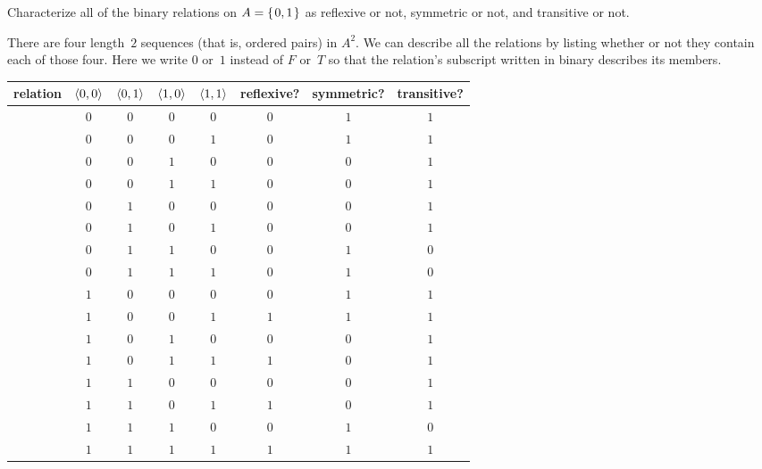 \documentclass{ibl}  %
\begin{document}
\begin{problem}[\maxlength]
  Characterize all of the binary relations on $A=\mbox{$\{\hspace{0.1em}0,1\hspace{0.1em}\}$}$
  as reflexive or not, symmetric or not,
  and transitive or not.
\begin{answer}
There are four length~$2$ sequences (that is, ordered pairs) in $A^2$.
We can describe all the relations by listing whether or not they
contain each of those four.
Here we write $0$ or~$1$ instead of $F$ or~$T$ so that the relation's
subscript written in binary describes its members.
\begin{center}
  \def\adjrel#1{\makebox[1.5em][l]{#1}} %
  \begin{tabular}{c|cccc|ccc}
    relation
    &$\langle0,0\rangle$ &$\langle0,1\rangle$ &$\langle1,0\rangle$ &$\langle1,1\rangle$
      &reflexive?  &symmetric?  &transitive?  \\ \hline
    \adjrel{$R_0$} &$0$ &$0$ &$0$ &$0$ &$0$  &$1$  &$1$  \\ 
    \adjrel{$R_1$} &$0$ &$0$ &$0$ &$1$ &$0$  &$1$  &$1$  \\ 
    \adjrel{$R_2$} &$0$ &$0$ &$1$ &$0$ &$0$  &$0$  &$1$  \\ 
    \adjrel{$R_3$} &$0$ &$0$ &$1$ &$1$ &$0$  &$0$  &$1$  \\[0.5ex] %
    \adjrel{$R_4$} &$0$ &$1$ &$0$ &$0$ &$0$  &$0$  &$1$  \\ 
    \adjrel{$R_5$} &$0$ &$1$ &$0$ &$1$ &$0$  &$0$  &$1$  \\ 
    \adjrel{$R_6$} &$0$ &$1$ &$1$ &$0$ &$0$  &$1$  &$0$  \\ 
    \adjrel{$R_7$} &$0$ &$1$ &$1$ &$1$ &$0$  &$1$  &$0$  \\[0.5ex] %
    \adjrel{$R_8$} &$1$ &$0$ &$0$ &$0$ &$0$  &$1$  &$1$  \\ 
    \adjrel{$R_9$} &$1$ &$0$ &$0$ &$1$ &$1$  &$1$  &$1$  \\ 
    \adjrel{$R_{10}$} &$1$ &$0$ &$1$ &$0$ &$0$  &$0$  &$1$  \\ 
    \adjrel{$R_{11}$} &$1$ &$0$ &$1$ &$1$ &$1$  &$0$  &$1$  \\[0.5ex] %
    \adjrel{$R_{12}$} &$1$ &$1$ &$0$ &$0$ &$0$  &$0$  &$1$  \\ 
    \adjrel{$R_{13}$} &$1$ &$1$ &$0$ &$1$ &$1$  &$0$  &$1$  \\ 
    \adjrel{$R_{14}$} &$1$ &$1$ &$1$ &$0$ &$0$  &$1$  &$0$  \\ 
    \adjrel{$R_{15}$} &$1$ &$1$ &$1$ &$1$ &$1$  &$1$  &$1$  
  \end{tabular}
\end{center}
\end{answer}
\end{problem}
\end{document}
